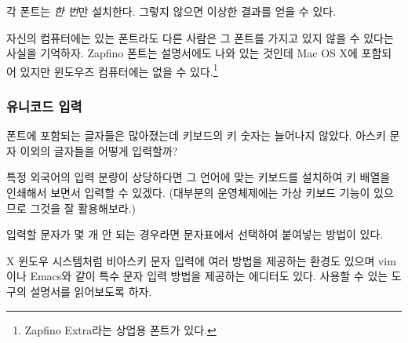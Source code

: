 각 폰트는 \emph{한 번}만 설치한다. 그렇지 않으면 이상한 결과를 얻을 수 있다.

자신의 컴퓨터에는 있는 폰트라도 다른 사람은 그 폰트를 가지고 있지 않을 수 있다는 사실을 기억하자. Zapfino 폰트는  설명서에도 나와 있는 것인데 Mac OS X에 포함되어 있지만 윈도우즈 컴퓨터에는 없을 수 있다.\footnote{Zapfino Extra라는 상업용 폰트가 있다.}

\subsubsection{유니코드 입력}

폰트에 포함되는 글자들은 많아졌는데 키보드의 키 숫자는 늘어나지 않았다. 아스키 문자 이외의 글자들을 어떻게 입력할까?

특정 외국어의 입력 분량이 상당하다면 그 언어에 맞는 키보드를 설치하여 키 배열을 인쇄해서 보면서 입력할 수 있겠다. (대부분의 운영체제에는 가상 키보드 기능이 있으므로 그것을 잘 활용해보라.)

입력할 문자가 몇 개 안 되는 경우라면 문자표에서 선택하여 붙여넣는 방법이 있다.

X 윈도우 시스템처럼 비아스키 문자 입력에 여러 방법을 제공하는 환경도 있으며 
vim이나 Emacs와 같이 특수 문자 입력 방법을 제공하는 에디터도 있다.
사용할 수 있는 도구의 설명서를 읽어보도록 하자.

